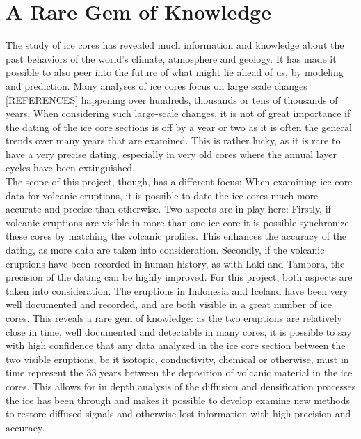 \documentclass[../../CompleteThesis/Complete_1stDraft]{subfiles}
\begin{document}
	\section[A Rare Gem]{A Rare Gem of Knowledge}
	The study of ice cores has revealed much information and knowledge about the past behaviors of the world's climate, atmosphere and geology. It has made it possible to also peer into the future of what might lie ahead of us, by modeling and prediction. Many analyses of ice cores focus on large scale changes [REFERENCES] happening over hundreds, thousands or tens of thousands of years. When considering such large-scale changes, it is not of great importance if the dating of the ice core sections is off by a year or two as it is often the general trends over many years that are examined. This is rather lucky, as it is rare to have a very precise dating, especially in very old cores where the annual layer cycles have been extinguished. \\
	The scope of this project, though, has a different focus: When examining ice core data for volcanic eruptions, it is possible to date the ice cores much more accurate and precise than otherwise. Two aspects are in play here: Firstly, if volcanic eruptions are visible in more than one ice core it is possible synchronize these cores by matching the volcanic profiles. This enhances the accuracy of the dating, as more data are taken into consideration. Secondly, if the volcanic eruptions have been recorded in human history, as with Laki and Tambora, the precision of the dating can be highly improved. For this project, both aspects are taken into consideration. The eruptions in Indonesia and Iceland have been very well documented and recorded, and are both visible in a great number of ice cores. This reveals a rare gem of knowledge: as the two eruptions are relatively close in time, well documented and detectable in many cores, it is possible to say with high confidence that any data analyzed in the ice core section between the two visible eruptions, be it isotopic, conductivity, chemical or otherwise, must in time represent the 33 years between the deposition of volcanic material in the ice cores. This allows for in depth analysis of the diffusion and densification processes the ice has been through and makes it possible to develop examine new methods to restore diffused signals and otherwise lost information with high precision and accuracy.
	
\end{document}
